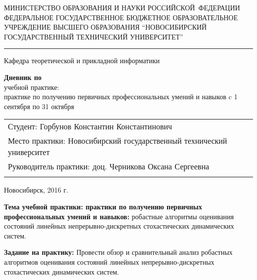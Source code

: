 \documentclass[a4paper,14pt]{extarticle}
\begin{document}
\begin{titlepage}

	\begin{center}
		\MakeTextUppercase{ Министерство образования и науки
			Российской~Федерации }
		\bigbreak
		ФЕДЕРАЛЬНОЕ ГОСУДАРСТВЕННОЕ БЮДЖЕТНОЕ ОБРАЗОВАТЕЛЬНОЕ УЧРЕЖДЕНИЕ
			ВЫСШЕГО ОБРАЗОВАНИЯ
		\bigbreak
		\MakeTextUppercase{\enquote{Новосибирский государственный технический
			университет}}
			\smallbreak
			\hrule
		\bigbreak\bigbreak

		Кафедра теоретической и прикладной информатики

		\vspace{100pt}

		\textbf{\LARGE{Дневник по}\\}
		\bigbreak
		учебной практике: \\
			практике по получению первичных профессиональных умений и навыков
		\bigbreak\bigbreak
		c 1 сентября по 31 октября

		\vspace{100pt}
	\end{center}

	\begin{center}
		\begin{tabular}{l}
			\medbreak
			Студент:         Горбунов Константин Константинович \\
			\medbreak
			Место практики:  Новосибирский государственный технический университет \\
			\medbreak
			Руководитель практики: доц. Черникова Оксана Сергеевна \\
			\medbreak
		\end{tabular}
	\end{center}

	\begin{center}
		\vspace{\fill}
		Новосибирск, 2016 г.
	\end{center}

\end{titlepage}

\newpage

\noindent \textbf{Тема учебной практики: практики по получению первичных профессиональных
умений и навыков:} робастные алгоритмы оценивания состояний линейных 
непрерывно-дискретных стохастических динамических систем.

\bigbreak

\noindent \textbf{Задание на практику:}
Провести обзор и сравнительный анализ робастных алгоритмов оценивания состояний
линейных непрерывно-дискретных стохастических динамических систем.
\end{document}
